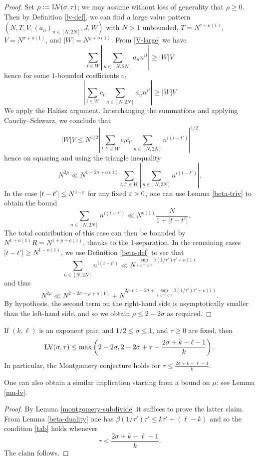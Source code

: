 \begin{proof}  Set $\rho := \mathrm{LV}(\sigma,\tau)$; we may assume without loss of generality that $\rho \geq 0$.  Then by Definition \ref{lv-def}, we can find a large value pattern $(N,T,V,(a_n)_{n \in [N,2N]},J,W)$  with $N > 1$ unbounded, $T = N^{\tau + o(1)}$, $V = N^{\sigma + o(1)}$, and $|W| = N^{\rho+o(1)}$.  From \eqref{V-large} we have
$$ \sum_{t \in W} \left|\sum_{n \in [N,2N]} a_n n^{it} \right| \geq |W|V$$
hence for some $1$-bounded coefficients $c_t$
$$ \left|\sum_{t \in W} c_t \sum_{n \in [N,2N]} a_n n^{it} \right| \geq |W|V$$
We apply the Hal\'asz argument. Interchanging the summations and applying Cauchy--Schwarz, we conclude that
$$ |W|V \leq N^{1/2} \left|\sum_{t, t' \in W} c_t \overline{c_{t'}} \sum_{n \in [N,2N]} n^{i(t-t')} \right|^{1/2}$$
hence on squaring and using the triangle inequality
$$ N^{2\rho} \ll N^{1-2\sigma+o(1)} \sum_{t,t' \in W} \left|\sum_{n \in [N,2N]} n^{i(t-t')} \right|.$$
In the case $|t - t'| \leq N^{1-\varepsilon}$ for any fixed $\varepsilon>0$, one can use Lemma \ref{beta-triv} to obtain the bound
$$ \sum_{n \in [N,2N]} n^{i(t-t')} \ll N^{o(1)} \frac{N}{1 + |t - t'|}.$$
The total contribution of this case can then be bounded by $N^{1+o(1)} R = N^{1+\rho+o(1)}$, thanks to the $1$-separation.
In the remaining cases $|t - t'| \geq N^{1-o(1)}$, we use Definition \ref{beta-def} to see that
$$ \sum_{n \in [N,2N]} n^{i(t-t')} \ll N^{\sup_{1 \leq \tau' \leq \tau} \beta(1/\tau') \tau' + o(1)}$$
and thus
$$ N^{2\rho} \ll N^{2-2\sigma+\rho+o(1)} + N^{2\rho + 1-2\sigma+\sup_{1 \leq \tau' \leq \tau} \beta(1/\tau') \tau' + o(1)}.$$
By hypothesis, the second term on the right-hand side is asymptotically smaller than the left-hand side, and so we obtain $\rho \leq 2-2\sigma$ as required.
\end{proof}

\begin{corollary}\label{exp-lv}  If $(k,\ell)$ is an exponent pair, and $1/2 \leq \sigma \leq 1$, and $\tau \geq 0$ are fixed, then
$$\mathrm{LV}(\sigma,\tau) \leq \max\left( 2-2\sigma, 2 - 2\sigma + \tau - \frac{2\sigma+k-\ell-1}{k} \right).$$
In particular, the Montgomery conjecture holds for $\tau \leq \frac{2\sigma+k-\ell-1}{k}$.
\end{corollary}

One can also obtain a similar implication starting from a bound on $\mu$: see Lemma \ref{mu-lv}.

\begin{proof}  By Lemma \ref{montgomery-subdivide} it suffices to prove the latter claim.  From Lemma \ref{beta-duality} one has
    $\beta(1/\tau') \tau' \leq k \tau' + (\ell-k)$
and so the condition \eqref{tab} holds whenever
$$ \tau < \frac{2\sigma+k-\ell-1}{k}.$$
The claim follows.
\end{proof}

